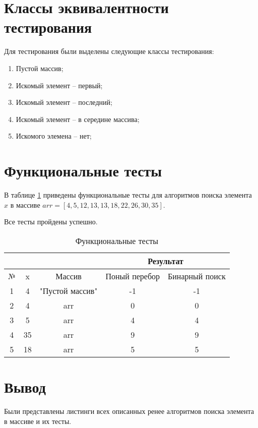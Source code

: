 \section{Классы эквивалентности тестирования}

Для тестирования были выделены следующие классы тестирования:
\begin{enumerate}
	\item {Пустой массив};
	\item {Искомый элемент -- первый};
	\item {Искомый элемент -- последний};
	\item {Искомый элемент -- в середине массива};
	\item {Искомого элемена -- нет};
\end{enumerate}

\section{Функциональные тесты}
В таблице \ref{tbl:functional_test} приведены функциональные тесты для алгоритмов поиска элемента $x$ в массиве $arr = [4, 5, 12, 13, 13, 18, 22, 26, 30, 35]$. 

Все тесты пройдены успешно.

\FloatBarrier
\begin{table}[h]
	\begin{center}
		\begin{threeparttable}
			\captionsetup{justification=raggedright,singlelinecheck=off}
			\caption{\label{tbl:functional_test} Функциональные тесты}
			\begin{tabular}{|c|c|c|c|c|}
				\hline
				& & & \multicolumn{2}{c|}{Результат} \\
				\hline
				№ & x & Массив & Поный перебор & Бинарный поиск \\
				\hline
				1& 4 & "Пустой массив" & -1 & -1 \\
				\hline
				2& 4 & arr & 0 & 0 \\
				\hline
				3& 5 & arr &4&4 \\
				\hline
				4& 35 & arr &9&9 \\
				\hline
				5& 18 & arr &5&5 \\
				\hline
			\end{tabular}
		\end{threeparttable}
	\end{center}
\end{table}
\FloatBarrier


\section*{Вывод}

Были представлены листинги всех описанных ренее алгоритмов поиска элемента в массиве и их тесты.

\clearpage
